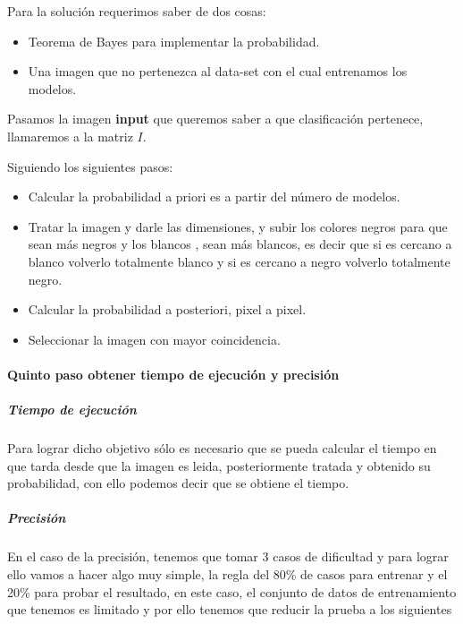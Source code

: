 \documentclass[
  spanish,
]{article}
\providecommand{\tightlist}{%
  \setlength{\itemsep}{0pt}\setlength{\parskip}{0pt}}
\begin{document}
Para la solución requerimos saber de dos cosas:

\begin{itemize}
\tightlist
\item
  Teorema de Bayes para implementar la probabilidad.
\item
  Una imagen que no pertenezca al data-set con el cual entrenamos los
  modelos.
\end{itemize}

Pasamos la imagen \textbf{input} que queremos saber a que clasificación
pertenece, llamaremos a la matriz \(I\).

Siguiendo los siguientes pasos:

\begin{itemize}
\tightlist
\item
  Calcular la probabilidad a priori es a partir del número de modelos.
\item
  Tratar la imagen y darle las dimensiones, y subir los colores negros
  para que sean más negros y los blancos , sean más blancos, es decir
  que si es cercano a blanco volverlo totalmente blanco y si es cercano
  a negro volverlo totalmente negro.
\item
  Calcular la probabilidad a posteriori, pixel a pixel.
\item
  Seleccionar la imagen con mayor coincidencia.
\end{itemize}

\hypertarget{quinto-paso-obtener-tiempo-de-ejecuciuxf3n-y-precisiuxf3n}{%
\paragraph{Quinto paso obtener tiempo de ejecución y
precisión}\label{quinto-paso-obtener-tiempo-de-ejecuciuxf3n-y-precisiuxf3n}}

\hypertarget{tiempo-de-ejecuciuxf3n}{%
\subparagraph{Tiempo de ejecución}\label{tiempo-de-ejecuciuxf3n}}

Para lograr dicho objetivo sólo es necesario que se pueda calcular el
tiempo en que tarda desde que la imagen es leida, posteriormente tratada
y obtenido su probabilidad, con ello podemos decir que se obtiene el
tiempo.

\hypertarget{precisiuxf3n}{%
\subparagraph{Precisión}\label{precisiuxf3n}}

En el caso de la precisión, tenemos que tomar 3 casos de dificultad y
para lograr ello vamos a hacer algo muy simple, la regla del 80\% de
casos para entrenar y el 20\% para probar el resultado, en este caso, el
conjunto de datos de entrenamiento que tenemos es limitado y por ello
tenemos que reducir la prueba a los siguientes
\end{document}
